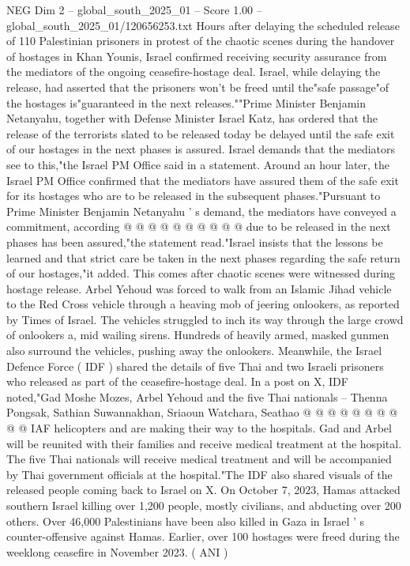 \begin{textsample}{NEG Dim 2 – global\_south\_2025\_01 – Score 1.00 – global\_south\_2025\_01/120656253.txt}  \label{ex:f2_neg_121}
Hours after delaying the scheduled release of 110 Palestinian prisoners in protest of the chaotic scenes during the handover of hostages in Khan Younis, Israel confirmed receiving security assurance from the mediators of the ongoing ceasefire-hostage deal.
Israel, while delaying the release, had asserted that the prisoners won't be freed until the"safe passage"of the hostages is"guaranteed in the next releases.""Prime Minister Benjamin Netanyahu, together with Defense Minister Israel Katz, has ordered that the release of the terrorists slated to be released today be delayed until the safe exit of our hostages in the next phases is assured.
Israel demands that the mediators see to this,"the Israel PM Office said in a statement.
Around an hour later, the Israel PM Office confirmed that the mediators have assured them of the safe exit for its hostages who are to be released in the subsequent phases."Pursuant to Prime Minister Benjamin Netanyahu ' s demand, the mediators have conveyed a commitment, according @ @ @ @ @ @ @ @ @ @ due to be released in the next phases has been assured,"the statement read."Israel insists that the lessons be learned and that strict care be taken in the next phases regarding the safe return of our hostages,"it added.
This comes after chaotic scenes were witnessed during hostage release.
Arbel Yehoud was forced to walk from an Islamic Jihad vehicle to the Red Cross vehicle through a heaving mob of jeering onlookers, as reported by Times of Israel.
The vehicles struggled to inch its way through the large crowd of onlookers a, mid wailing sirens.
Hundreds of heavily armed, masked gunmen also surround the vehicles, pushing away the onlookers.
Meanwhile, the Israel Defence Force ( IDF ) shared the details of five Thai and two Israeli prisoners who released as part of the ceasefire-hostage deal.
In a post on X, IDF noted,"Gad Moshe Mozes, Arbel Yehoud and the five Thai nationals -- Thenna Pongsak, Sathian Suwannakhan, Sriaoun Watchara, Seathao @ @ @ @ @ @ @ @ @ @ IAF helicopters and are making their way to the hospitals.
Gad and Arbel will be reunited with their families and receive medical treatment at the hospital.
The five Thai nationals will receive medical treatment and will be accompanied by Thai government officials at the hospital."The IDF also shared visuals of the released people coming back to Israel on X.
On October 7, 2023, Hamas attacked southern Israel killing over 1,200 people, mostly civilians, and abducting over 200 others.
Over 46,000 Palestinians have been also killed in Gaza in Israel ' s counter-offensive against Hamas.
Earlier, over 100 hostages were freed during the weeklong ceasefire in November 2023. ( ANI )

\end{textsample}
